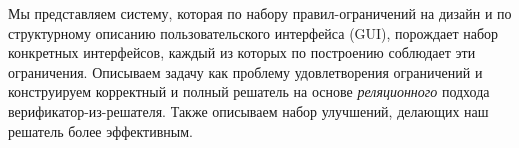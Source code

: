 
Мы представляем систему, которая по набору правил-ограничений на дизайн и по структурному описанию пользовательского интерфейса (GUI),
порождает набор конкретных интерфейсов, каждый из которых по построению соблюдает эти ограничения.
Описываем задачу как проблему удовлетворения ограничений и конструируем корректный и полный решатель на основе \emph{реляционного} подхода верификатор-из-решателя.
Также описываем набор улучшений, делающих наш решатель более эффективным.
